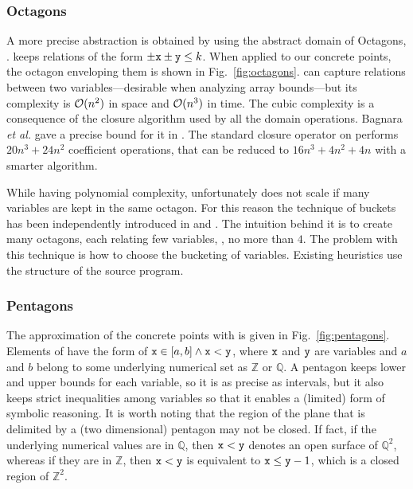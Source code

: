 \documentclass{sig-alternate}
\begin{document}
\subsubsection*{Octagons}
A more precise abstraction is obtained by using the abstract domain of Octagons, \Octagons. 
\Octagons{} keeps relations of the form $\pm \mathtt{x} \pm \mathtt{y} \leq k$.
When applied to our concrete points, the octagon enveloping them is shown in Fig.~\ref{fig:octagons}.
\Octagons{} can capture relations between two variables---desirable
when analyzing array bounds---but its complexity is $\mathcal{O}(n^2)$ in space and $\mathcal{O}(n^3)$ in time.
The cubic complexity is a consequence of the closure algorithm used by all the domain operations.
Bagnara \emph{et al.} gave a precise bound for it in \cite{Bagnara05}. The standard closure operator on \Octagons{} performs $20 n^3 + 24  n^2$ coefficient operations, that can be reduced to $16n^3 + 4n^2 +4n$ with a smarter algorithm.

While having polynomial complexity, \Octagons{} unfortunately does not
scale if many variables are kept in the same octagon.
For this reason the technique of buckets has been independently introduced in  \cite{BlanchetCousotEtAl03} and \cite{Venet04}.
The intuition behind it is to create many octagons, each relating few variables, \eg,  no more than $4$.
The problem with this technique is how to choose the bucketing of
variables. Existing heuristics use the structure of the source program.

\subsubsection*{Pentagons}
The approximation of the concrete points with \Pentagons{} is given in Fig.~\ref{fig:pentagons}.
Elements of \Pentagons{} have the form of $\mathtt{x} \in [a, b] \wedge \mathtt{x} < \mathtt{y}$, where $\mathtt{x}$ and $\mathtt{y}$ are variables and $a$ and $b$ belong to some underlying numerical set as $\mathbb{Z}$ or $\mathbb{Q}$.
A pentagon keeps lower and upper bounds for each variable, so it is as precise as intervals, but it also keeps strict inequalities among variables so that it enables a (limited) form of symbolic reasoning.
It is worth noting that the region of the plane that is delimited by a (two dimensional) pentagon may not be closed.
If fact, if the underlying numerical values are in $\mathbb{Q}$, then $\mathtt{x} < \mathtt{y}$ denotes an open surface of $\mathbb{Q}^2$, whereas if they are in $\mathbb{Z}$, then $\mathtt{x} < \mathtt{y}$ is equivalent to $\mathtt{x} \leq \mathtt{y} -1$, which is a closed region of $\mathbb{Z}^2$.
\end{document}
